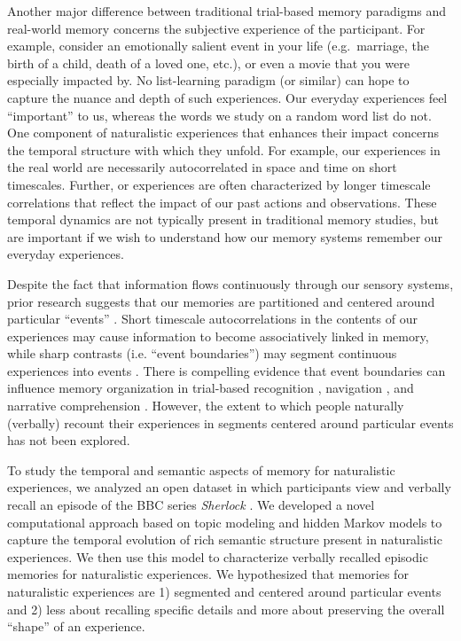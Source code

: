 \documentclass{article}
\begin{document}
{Another major difference between traditional trial-based memory paradigms and real-world memory concerns the subjective experience of the participant.  For example, consider an emotionally salient event in your life (e.g.\ marriage, the birth of a child, death of a loved one, etc.), or even a movie that you were especially impacted by.  No list-learning paradigm (or similar) can hope to capture the nuance and depth of such experiences.  Our everyday experiences feel ``important'' to us, whereas the words we study on a random word list do not.  One component of naturalistic experiences that enhances their impact concerns the temporal structure with which they unfold.  For example, our experiences in the real world are necessarily autocorrelated in space and time on short timescales.  Further, or experiences are often characterized by longer timescale correlations that reflect the impact of our past actions and observations.  These temporal dynamics are not typically present in traditional memory studies, but are important if we wish to understand how our memory systems remember our everyday experiences.

Despite the fact that information flows continuously through our sensory systems, prior research suggests that our memories are partitioned and centered around particular ``events'' \citep{Radv12, RadvZack11, BrunEtal18}. Short timescale autocorrelations in the contents of our experiences may cause information to become associatively linked in memory, while sharp contrasts (i.e. ``event boundaries'') may segment continuous experiences into events \citep{HeusEtal18, BrunEtal18, Radv12}. There is compelling evidence that event boundaries can influence memory organization in trial-based recognition \citep{HeusEtal18}, navigation \citep{BrunEtal18}, and narrative comprehension \citep{ZwaaRadv98, EzzyDava11}.  However, the extent to which people naturally (verbally) recount their experiences in segments centered around particular events has not been explored.

To study the temporal and semantic aspects of memory for naturalistic experiences, we analyzed an open dataset in which participants view and verbally recall an episode of the BBC series \textit{Sherlock}  \citep{ChenEtal17}. We developed a novel computational approach based on topic modeling \citep{BleiEtal03} and hidden Markov models \citep{Rabi89, BaldEtal17} to capture the temporal evolution of rich semantic structure present in naturalistic experiences. We then use this model to characterize verbally recalled episodic memories for naturalistic experiences. We hypothesized that memories for naturalistic experiences are 1) segmented and centered around particular events and 2) less about recalling specific details and more about preserving the overall ``shape'' of an experience.

}
\end{document}
